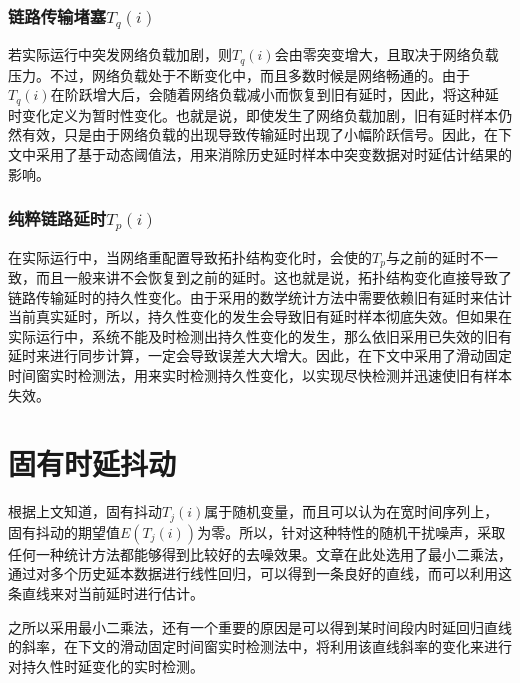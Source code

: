 \subsubsection{链路传输堵塞$T_{q}(i)$}
若实际运行中突发网络负载加剧，则$T_{q}(i)$会由零突变增大，且取决于网络负载压力。不过，网络负载处于不断变化中，而且多数时候是网络畅通的。由于$T_{q}(i)$在阶跃增大后，会随着网络负载减小而恢复到旧有延时，因此，将这种延时变化定义为暂时性变化。也就是说，即使发生了网络负载加剧，旧有延时样本仍然有效，只是由于网络负载的出现导致传输延时出现了小幅阶跃信号。因此，在下文中采用了基于动态阈值法，用来消除历史延时样本中突变数据对时延估计结果的影响。

\subsubsection{纯粹链路延时$T_{p}(i)$}
在实际运行中，当网络重配置导致拓扑结构变化时，会使的$T_{p}$与之前的延时不一致，而且一般来讲不会恢复到之前的延时。这也就是说，拓扑结构变化直接导致了链路传输延时的持久性变化。由于采用的数学统计方法中需要依赖旧有延时来估计当前真实延时，所以，持久性变化的发生会导致旧有延时样本彻底失效。但如果在实际运行中，系统不能及时检测出持久性变化的发生，那么依旧采用已失效的旧有延时来进行同步计算，一定会导致误差大大增大。因此，在下文中采用了滑动固定时间窗实时检测法，用来实时检测持久性变化，以实现尽快检测并迅速使旧有样本失效。

\section{固有时延抖动}
根据上文知道，固有抖动$T_{j}(i)$属于随机变量，而且可以认为在宽时间序列上，固有抖动的期望值$E(T_{j}(i))$为零。所以，针对这种特性的随机干扰噪声，采取任何一种统计方法都能够得到比较好的去噪效果。文章在此处选用了最小二乘法，通过对多个历史延本数据进行线性回归，可以得到一条良好的直线，而可以利用这条直线来对当前延时进行估计。

之所以采用最小二乘法，还有一个重要的原因是可以得到某时间段内时延回归直线的斜率，在下文的滑动固定时间窗实时检测法中，将利用该直线斜率的变化来进行对持久性时延变化的实时检测。


